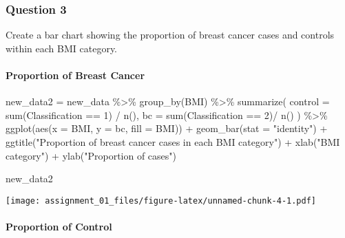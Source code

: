 \documentclass[
]{article}
\newenvironment{Shaded}{\begin{snugshade}}{\end{snugshade}}
\newcommand{\AttributeTok}[1]{\textcolor[rgb]{0.77,0.63,0.00}{#1}}
\newcommand{\DecValTok}[1]{\textcolor[rgb]{0.00,0.00,0.81}{#1}}
\newcommand{\FunctionTok}[1]{\textcolor[rgb]{0.00,0.00,0.00}{#1}}
\newcommand{\NormalTok}[1]{#1}
\newcommand{\OtherTok}[1]{\textcolor[rgb]{0.56,0.35,0.01}{#1}}
\newcommand{\SpecialCharTok}[1]{\textcolor[rgb]{0.00,0.00,0.00}{#1}}
\newcommand{\StringTok}[1]{\textcolor[rgb]{0.31,0.60,0.02}{#1}}
\begin{document}
\hypertarget{question-3}{%
\subsubsection{Question 3}\label{question-3}}

Create a bar chart showing the proportion of breast cancer cases and
controls within each BMI category.

\hypertarget{proportion-of-breast-cancer}{%
\paragraph{Proportion of Breast
Cancer}\label{proportion-of-breast-cancer}}

\begin{Shaded}
\begin{Highlighting}[]
\NormalTok{new\_data2 }\OtherTok{=}
\NormalTok{new\_data }\SpecialCharTok{\%\textgreater{}\%} 
  \FunctionTok{group\_by}\NormalTok{(BMI) }\SpecialCharTok{\%\textgreater{}\%} 
  \FunctionTok{summarize}\NormalTok{(}
    \AttributeTok{control =} \FunctionTok{sum}\NormalTok{(Classification }\SpecialCharTok{==} \DecValTok{1}\NormalTok{) }\SpecialCharTok{/} \FunctionTok{n}\NormalTok{(),}
    \AttributeTok{bc =} \FunctionTok{sum}\NormalTok{(Classification }\SpecialCharTok{==} \DecValTok{2}\NormalTok{)}\SpecialCharTok{/} \FunctionTok{n}\NormalTok{()}
\NormalTok{  ) }\SpecialCharTok{\%\textgreater{}\%} 
  \FunctionTok{ggplot}\NormalTok{(}\FunctionTok{aes}\NormalTok{(}\AttributeTok{x =}\NormalTok{ BMI, }\AttributeTok{y =}\NormalTok{ bc, }\AttributeTok{fill =}\NormalTok{ BMI)) }\SpecialCharTok{+}
  \FunctionTok{geom\_bar}\NormalTok{(}\AttributeTok{stat =} \StringTok{"identity"}\NormalTok{) }\SpecialCharTok{+}
  \FunctionTok{ggtitle}\NormalTok{(}\StringTok{"Proportion of breast cancer cases in each BMI category"}\NormalTok{) }\SpecialCharTok{+}
  \FunctionTok{xlab}\NormalTok{(}\StringTok{"BMI category"}\NormalTok{) }\SpecialCharTok{+} \FunctionTok{ylab}\NormalTok{(}\StringTok{"Proportion of cases"}\NormalTok{)}

\NormalTok{new\_data2}
\end{Highlighting}
\end{Shaded}

\texttt{[image: assignment\_01\_files/figure-latex/unnamed-chunk-4-1.pdf]}

\hypertarget{proportion-of-control}{%
\paragraph{Proportion of Control}\label{proportion-of-control}}
\end{document}

